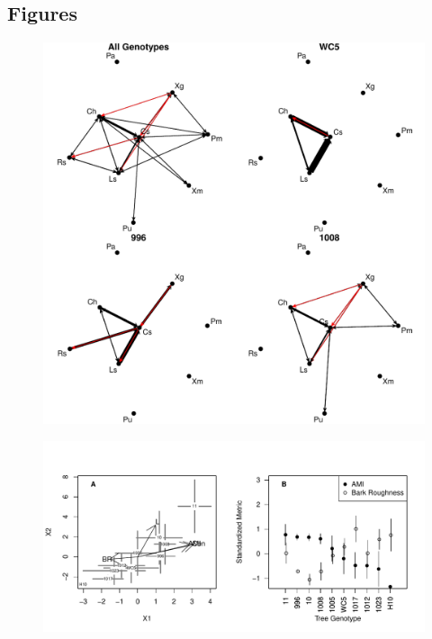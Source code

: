 \documentclass[11pt,twocolumn,twoside,lineno]{pnas-new}
\begin{document}
\newpage






\newpage

\subsection*{Figures}

\newpage

\begin{figure}[ht]
\centering
\includegraphics[width=\linewidth]{cn_onc.pdf}
\caption{}
\label{fig:}
\end{figure}

\begin{figure}[ht]
\centering
\includegraphics[width=\linewidth]{h2_plot.pdf}
\caption{}
\label{fig:}
\end{figure}
\end{document}
